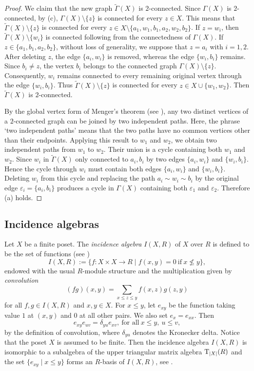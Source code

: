\documentclass[reqno]{amsart}
\numberwithin{equation}{section}
\theoremstyle{plain}
\theoremstyle{definition}
\begin{document}
\begin{proof}
We claim that the new graph $\widetilde \Gamma(X)$ is $2$-connected. Since $\Gamma(X)$ is
$2$-connected, by (c), $\Gamma(X)\setminus\{z\}$ is connected for every $z\in X$.
This means that $\widetilde \Gamma(X)\setminus\{z\}$ is connected for every $z\in X\setminus\{a_1,w_1,b_1,a_2,w_2,b_2\}$.
If $z=w_i$, then $\widetilde \Gamma(X)\setminus\{w_i\}$ is connected following from the connectedness of $\Gamma(X)$.
If $z\in \{a_1,b_1,a_2,b_2\}$, without loss of generality, we suppose that $z=a_i$ with $i=1,2$.
After deleting $z$, the edge $\{a_i, w_i\}$ is removed, whereas the edge $\{w_i, b_i\}$ remains.
Since $b_i\neq z$, the vertex $b_i$ belongs to the connected graph $\Gamma(X)\setminus\{z\}$.
Consequently, $w_i$ remains connected to every remaining original vertex through the edge $\{w_i,b_i\}$.
Thus $\widetilde \Gamma(X)\setminus\{z\}$ is connected for every $z\in X\cup \{w_1,w_2\}$.
Then $\widetilde \Gamma(X)$ is $2$-connected.

By the global vertex form of Menger's theorem (see
\cite[Theorem~3.3.6 (i)]{Diestel}), any two distinct vertices of a
$2$-connected graph can be joined by two independent paths.
Here, the phrase `two independent paths' means that the two paths have no common vertices other than their endpoints.
Applying this result to $w_1$ and $w_2$, we obtain two independent paths from $w_1$ to $w_2$.
 Their union is a cycle containing both $w_1$ and $w_2$.
Since $w_i$ in $\widetilde \Gamma(X)$ only connected to $a_i,b_i$ by two edges $\{a_i,w_i\}$ and $\{w_i,b_i\}$. Hence the cycle through
$w_i$ must contain both edges $\{a_i,w_i\}$ and $\{w_i,b_i\}$.
Deleting $w_i$ from this cycle and replacing the path
$a_i\sim w_i\sim b_i$ by the original edge
$\varepsilon_i=\{a_i,b_i\}$ produces a  cycle in $\Gamma(X)$
containing both $\varepsilon_1$ and $\varepsilon_2$.
Therefore (a) holds.
\end{proof}

\subsection{Incidence algebras}

Let $X$ be a finite poset. The {\em incidence algebra} $I(X,R)$ of $X$ over $R$ is defined to be the set of functions (see \cite{SpDo})
\[
I(X,R):=\{f: X\times X\longrightarrow R \mid f(x,y)=0\ \text{if}\ x\nleq y\},
\]
endowed with the usual $R$-module structure and the multiplication given by {\em convolution}
\[
(fg)(x,y)=\sum_{x\leq z\leq y}f(x,z)g(z,y)
\]
for all $f,g\in I(X,R)$ and $x,y\in X$. For $x\leq y$, let $e_{xy}$ be the function taking value $1$ at
$(x,y)$ and $0$ at all other pairs. We also set $e_x=e_{xx}$. Then
\begin{equation}\label{eq:matrix-unit-product}
e_{xy}e_{uv}=\delta_{yu}e_{xv},~\text{for~all}~x\leq y,\ u\leq v,
\end{equation}
by the definition of convolution, where $\delta_{yu}$ denotes the Kronecker delta.
Notice that the poset $X$ is assumed to be finite. Then the incidence algebra $I(X,R)$
is isomorphic to a subalgebra of the upper triangular matrix algebra ${\rm T}_{|X|}(R)$
and the set $\{e_{xy}\mid x\leq y\}$ forms an $R$-basis of $I(X,R)$, see \cite[Proposition 1.2.7]{SpDo}.
\end{document}

